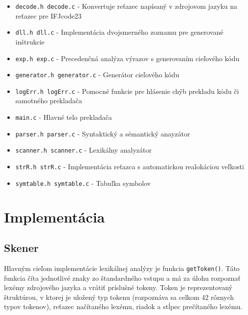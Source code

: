 \documentclass[a4paper,11pt]{article}
\begin{document}
\begin{itemize}

    \item \texttt{decode.h decode.c} - Konvertuje reťazec napísaný v zdrojovom jazyku na reťazec pre IFJcode23
    
    \item \texttt{dll.h dll.c} - Implementácia dvojsmerného zoznamu pre generované inštrukcie
    
    \item \texttt{exp.h exp.c} - Precedenčná analýza výrazov s generovaním cieľového kódu
    
    \item \texttt{generator.h generator.c} - Generátor cieľového kódu
    
    \item \texttt{logErr.h logErr.c} - Pomocné funkcie pre hlásenie chýb 
    prekladu kódu či samotného prekladača
    
    \item \texttt{main.c} - Hlavné telo prekladača 
    
    \item \texttt{parser.h parser.c} - Syntaktický a sémantický anayzátor
    
    \item \texttt{scanner.h scanner.c} - Lexikálny analyzátor
    
    \item \texttt{strR.h strR.c} - Implementácia reťazca s automatickou 
    realokáciou veľkosti
    
    \item \texttt{symtable.h symtable.c} - Tabuľka symbolov
    
\end{itemize}
\section{Implementácia}

\subsection{Skener}
Hlavným cieľom implementácie lexikálnej analýzy je funkcia \texttt{getToken()}. Táto funkcia číta jednotlivé znaky zo štandardného vstupu a má za úlohu rozpoznať lexémy zdrojového jazyka a vrátiť príslušné tokeny. Token je reprezentovaný štruktúrou, v ktorej je uložený typ tokenu (rozpoznáva sa celkom 42 rôznych typov tokenov), reťazec načítaného lexému, riadok a stĺpec prečítaného lexému.
\end{document}
